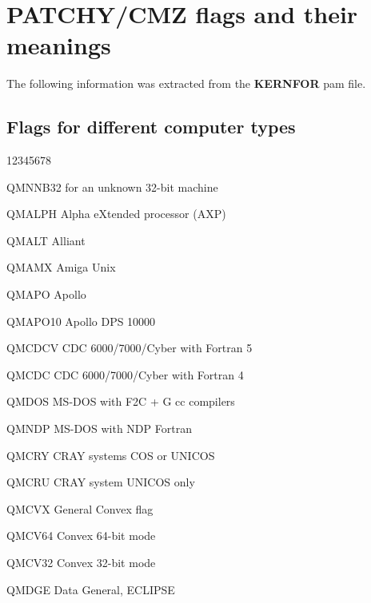 \chapter{PATCHY/CMZ flags and their meanings}
The following information was extracted from the {\bf KERNFOR} 
pam file.

\label{sect-FLAGS}

\section{Flags for different computer types}

\begin{DLtt}{12345678}
\item[QMNNB32] for an unknown 32-bit machine\\

\item[QMALPH]  Alpha eXtended processor (AXP)\\

\item[QMALT]   Alliant
\item[QMAMX]   Amiga Unix\\

\item[QMAPO]   Apollo
\item[QMAPO10] Apollo DPS 10000\\

\item[QMCDCV]  CDC 6000/7000/Cyber  with Fortran 5
\item[QMCDC]   CDC 6000/7000/Cyber  with Fortran 4\\

\item[QMDOS]   MS-DOS with F2C + G cc compilers
\item[QMNDP]   MS-DOS with NDP Fortran\\

\item[QMCRY]   CRAY systems COS or UNICOS
\item[QMCRU]   CRAY system UNICOS only\\

\item[QMCVX]   General Convex flag
\item[QMCV64]  Convex 64-bit mode 
\item[QMCV32]  Convex 32-bit mode\\

\item[QMDGE]   Data General, ECLIPSE\\


\end{DLtt}
